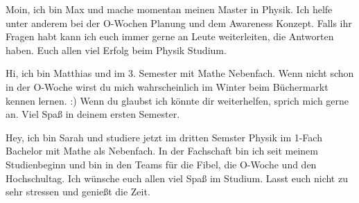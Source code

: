 \begin{multicols}{2}
{
Moin, ich bin Max und mache momentan meinen Master in Physik. Ich helfe unter anderem bei der O-Wochen Planung und dem Awareness Konzept. Falls ihr Fragen habt kann ich euch immer gerne an Leute weiterleiten, die Antworten haben. Euch allen viel Erfolg beim Physik Studium. 
}

\vspace{-0.1cm}

{
Hi, ich bin Matthias und im 3. Semester mit Mathe Nebenfach. Wenn nicht schon in der O-Woche wirst du mich wahrscheinlich  im Winter beim Büchermarkt kennen lernen. :) 
Wenn du glaubst ich könnte dir weiterhelfen, sprich mich gerne an. Viel Spaß in deinem ersten Semester.  
}

{
Hey, ich bin Sarah und studiere jetzt im dritten Semster Physik im 1-Fach Bachelor mit Mathe als Nebenfach. In der Fachschaft bin ich seit meinem Studienbeginn und bin in den Teams für die Fibel, die O-Woche und den Hochschultag. 
Ich wünsche euch allen viel Spaß im Studium. Lasst euch nicht zu sehr stressen und genießt die Zeit.  
}


\end{multicols}
